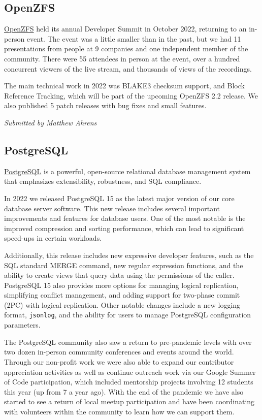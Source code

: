 \documentclass[a4paper]{report}
\begin{document}
\subsection{OpenZFS}

\href{https://openzfs.org/}{OpenZFS} held its annual Developer Summit in October 2022, returning to an in-person event. The event was a little smaller than in the past, but we had 11 presentations from people at 9 companies and one independent member of the community. There were 55 attendees in person at the event, over a hundred concurrent viewers of the live stream, and thousands of views of the recordings.

The main technical work in 2022 was BLAKE3 checksum support, and Block Reference Tracking, which will be part of the upcoming OpenZFS 2.2 release.  We also published 5 patch releases with bug fixes and small features.

{\em Submitted by Matthew Ahrens}

\subsection{PostgreSQL}

\href{https://www.postgresql.org/}{PostgreSQL} is a powerful, open-source relational database management system that emphasizes extensibility, robustness, and SQL compliance.

In 2022 we released PostgreSQL 15 as the latest major version of our core database server software. This new release includes several important improvements and features for database users. One of the most notable is the improved compression and sorting performance, which can lead to significant speed-ups in certain workloads.

Additionally, this release includes new expressive developer features, such as the SQL standard MERGE command, new regular expression functions, and the ability to create views that query data using the permissions of the caller. PostgreSQL 15 also provides more options for managing logical replication, simplifying conflict management, and adding support for two-phase commit (2PC) with logical replication.  Other notable changes include a new logging format, {\tt jsonlog}, and the ability for users to manage PostgreSQL configuration parameters.

The PostgreSQL community also saw a return to pre-pandemic levels with over two dozen in-person community conferences and events around the world. Through our non-profit work we were also able to expand our contributor appreciation activities as well as continue outreach work via our Google Summer of Code participation, which included mentorship projects involving 12 students this year (up from 7 a year ago). With the end of the pandemic we have also started to see a return of local meetup participation and have been coordinating with volunteers within the community to learn how we can support them.
\end{document}
